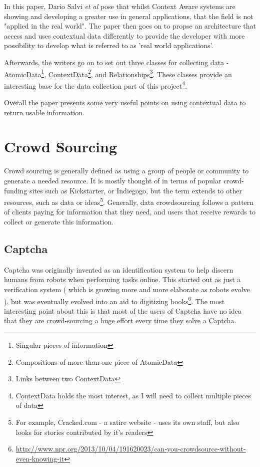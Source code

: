 \documentclass[11pt]{informatics-report}
\begin{document}
In this paper, Dario Salvi \textit{et al} pose that whilst Context Aware systems are showing and developing a greater use in general applications, that the field is not "applied in the real world"\cite{salviarchitecture}. The paper then goes on to propse an architecture that access and uses contextual data differently to provide the developer with more possibility to develop what is referred to as 'real world applications'.

Afterwards, the writers go on to set out three classes for collecting data - AtomicData\footnote{Singular pieces of information}, ContextData\footnote{Compositions of more than one piece of AtomicData}, and Relationships\footnote{Links between two ContextData}\cite{salviarchitecture}. These classes provide an interesting base for the data collection part of this project\footnote{ContextData holds the most interest, as I will need to collect multiple pieces of data}.

Overall the paper presents some very useful points on using contextual data to return usable information.

\section{Crowd Sourcing}

Crowd sourcing is generally defined as using a group of people or community to generate a needed resource. It is mostly thought of in terms of popular crowd-funding sites such as Kickstarter, or Indiegogo, but the term extends to other resources, such as data or ideas\footnote{For example, Cracked.com - a satire website - uses its own staff, but also looks for stories contributed by it's readers}. Generally, data crowdsourcing follows a pattern of clients paying for information that they need, and users that receive rewards to collect or generate this information.

\subsection{Captcha} 

Captcha was originally invented as an identification system to help discern humans from robots when performing tasks online. This started out as just a verification system ( which is growing more and more elaborate as robots evolve ), but was eventually evolved into an aid to digitizing books\footnote{\url{http://www.npr.org/2013/10/04/191620023/can-you-crowdsource-without-even-knowing-it}}. The most interesting point about this is that most of the users of Captcha have no idea that they are crowd-sourcing a huge effort every time they solve a Captcha.
\end{document}
